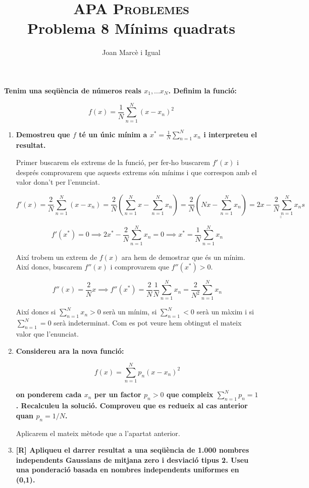 \documentclass[a4paper]{article}
\title{\textsc{APA Problemes} \\ Problema 8 Mínims quadrats}
\author{Joan Marcè i Igual}
\date{}
\begin{document}
\maketitle

\textbf{Tenim una seqüència de números reals $x_1,...x_N$. Definim la funció:}

$$ f(x) = \frac{1}{N}\sum_{n=1}^N(x - x_n)^2 $$

\begin{enumerate}

\item \textbf{Demostreu que $f$ té un únic mínim a $x^* = \frac{1}{N} \sum_{n=1}^N x_n$ i interpreteu el resultat.}

Primer buscarem els extrems de la funció, per fer-ho buscarem $f'(x)$ i després comprovarem que aquests extrems són mínims i que correspon amb el valor dona't per l'enunciat.

$$ f'(x) = \frac{2}{N}\sum_{n=1}^N (x - x_n) = \frac{2}{N}\left(\sum_{n=1}^N x - \sum_{n=1}^N x_n \right) = \frac{2}{N}\left(Nx - \sum_{n=1}^N x_n \right) = \underline{\underline{2x - \frac{2}{N}\sum_{n=1}^N x_ns}} $$

$$ f'(x^*) = 0 \implies 2x^* - \frac{2}{N}\sum_{n=1}^N x_n = 0 \implies \boxed{x^* = \frac{1}{N}\sum_{n=1}^N x_n} $$

Així trobem un extrem de $f(x)$ ara hem de demostrar que és un mínim. Així doncs, buscarem $f''(x)$ i comprovarem que $f''(x^*) > 0$.

$$ f''(x) = \frac{2}{N}x \implies f''(x^*) = \frac{2}{N}\frac{1}{N}\sum_{n=1}^N x_n = \frac{2}{N^2} \sum_{n=1}^N x_n$$

Així doncs si $\sum_{n=1}^N x_n > 0$ serà un mínim, si $\sum_{n=1}^N < 0$ serà un màxim i si $\sum_{n=1}^N = 0$ serà indeterminat. Com es pot veure hem obtingut el mateix valor que l'enunciat.

\item \textbf{Considereu ara la nova funció:}

$$ f(x) = \sum_{n=1}^N p_n (x - x_n)^2 $$

\textbf{on ponderem cada $x_n$ per un factor $p_n > 0$ que compleix $\sum_{n=1}^N p_n = 1$. Recalculeu la solució. Comproveu que es redueix al cas anterior quan $p_n = 1/N$.}

Aplicarem el mateix mètode que a l'apartat anterior.

\item \textbf{[R] Apliqueu el darrer resultat a una seqüència de 1.000 nombres independents Gaussians de mitjana zero i desviació tipus 2. Useu una ponderació basada en nombres independents uniformes en (0,1).}

\end{enumerate}
\end{document}

